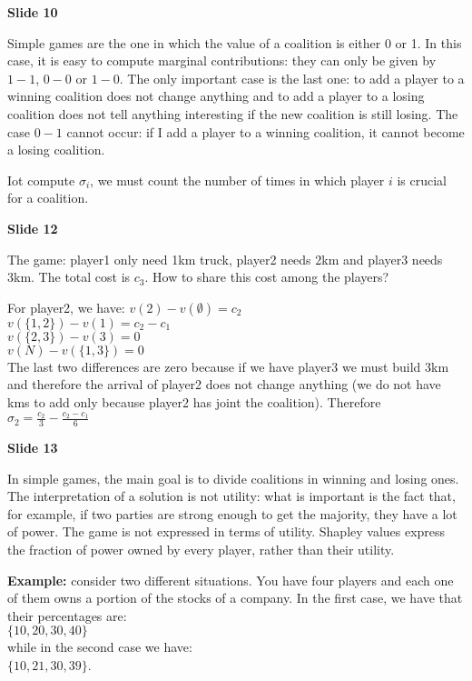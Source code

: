 \bigskip
\noindent \textbf{Slide 10}

\noindent Simple games are the one in which the value of a coalition is either 
0 or 1. In this case, it is easy to compute marginal contributions: they can 
only be given by $1-1$, $0 - 0$ or $1 - 0$. The only important case is the 
last one: to add a player to a winning coalition does not change anything and 
to add a player to a losing coalition does not tell anything interesting if 
the new coalition is still losing. 
The case $0 - 1$ cannot occur: if I add a player to a winning coalition, it 
cannot become a losing coalition.

\noindent Iot compute $\sigma_i$, we must count the number of times in which 
player $i$ is crucial for a coalition.

\bigskip
\noindent \textbf{Slide 12}

\noindent The game: player1 only need 1km truck, player2 needs 2km and player3 
needs 3km. The total cost is $c_3$. How to share this cost among the players? 

\noindent For player2, we have:
$v(2) - v(\emptyset) = c_2$\\
$v(\{1,2\}) - v(1) = c_2 - c_1$\\
$v(\{2,3\}) - v(3) = 0$\\
$v(N) - v(\{1,3\}) = 0$\\
The last two differences are zero because if we have player3 we must build 
3km and therefore the arrival of player2 does not change anything (we do not 
have kms to add only because player2 has joint the coalition). 
Therefore $\sigma_2 = \frac{c_2}{3} - \frac{c_2-c_1}{6}$

\bigskip
\noindent \textbf{Slide 13}

\noindent In simple games, the main goal is to divide coalitions in winning 
and losing ones. The interpretation of a solution is not utility: what is 
important is the fact that, for example, if two parties are strong enough to 
get the majority, they have a lot of power. The game is not expressed in terms 
of utility. Shapley values express the fraction of power owned by every player, 
rather than their utility.

\noindent \textbf{Example:} consider two different situations. You have 
four players and each one of them owns a portion of the stocks of a 
company. In the first case, we have that their percentages are:\\
$\{10, 20, 30, 40\}$\\
while in the second case we have: \\
$\{10, 21, 30, 39\}$.

